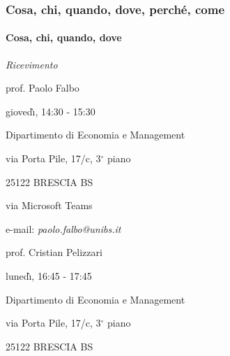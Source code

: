 \begin{frame}%
%

\frametitle{Cosa, chi, quando, dove, perch\'{e}, come}%
%

\framesubtitle{Cosa, chi, quando, dove}%
%

%


\begin{stepitemize}
\item \textit{Ricevimento}

\begin{stepitemize}
\item prof. Paolo Falbo

gioved\`{\i}, 14:30 - 15:30

\begin{stepitemize}
\item Dipartimento di Economia e Management

via Porta Pile, 17/c, 3$%
{{}^\circ}%
$ piano

25122 BRESCIA BS

\item via Microsoft Teams

\item e-mail:
\color{light-blue}
\textit{paolo.falbo@unibs.it}%
\color{black}%

\end{stepitemize}

\item prof. Cristian Pelizzari

luned\`{\i}, 16:45 - 17:45

\begin{stepitemize}
\item Dipartimento di Economia e Management

via Porta Pile, 17/c, 3$%
{{}^\circ}%
$ piano

25122 BRESCIA BS


\end{stepitemize}
\end{stepitemize}
\end{stepitemize}
\end{frame}
